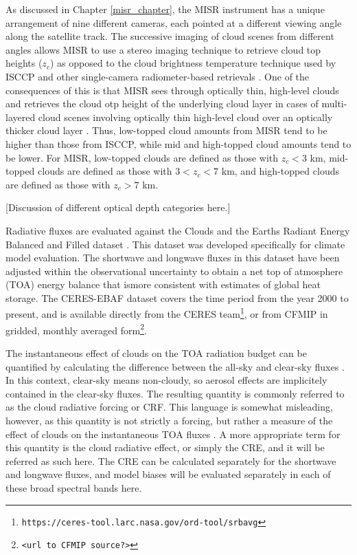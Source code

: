 As discussed in Chapter \ref{misr_chapter}, the MISR instrument has a unique arrangement of nine different cameras, each pointed at a different viewing angle along the satellite track. The successive imaging of cloud scenes from different angles allows MISR to use a stereo imaging technique to retrieve cloud top heights ($z_c$) as opposed to the cloud brightness temperature technique used by ISCCP and other single-camera radiometer-based retrievals \citep{moroney_et_al_2002, muller_et_al_2002}. One of the consequences of this is that MISR sees through optically thin, high-level clouds and retrieves the cloud otp height of the underlying cloud layer in cases of multi-layered cloud scenes involving optically thin high-level cloud over an optically thicker cloud layer \citep{marchand_et_al_2010}. Thus, low-topped cloud amounts from MISR tend to be higher than those from ISCCP, while mid and high-topped cloud amounts tend to be lower. For MISR, low-topped clouds are defined as those with $z_c < 3$ km, mid-topped clouds are defined as those with $3 < z_c < 7$ km, and high-topped clouds are defined as those with $z_c > 7$ km.

[Discussion of different optical depth categories here.]

Radiative fluxes are evaluated against the Clouds and the Earths Radiant Energy Balanced and Filled dataset \citep[CERES-EBAF Version 2.6;][]{loeb_et_al_2009}. This dataset was developed specifically for climate model evaluation. The shortwave and longwave fluxes in this dataset have been adjusted within the observational uncertainty to obtain a net top of atmosphere (TOA) energy balance that ismore consistent with estimates of global heat storage. The CERES-EBAF dataset covers the time period from the year 2000 to present, and is available directly from the CERES team\footnote{\tt https://ceres-tool.larc.nasa.gov/ord-tool/srbavg}, or from CFMIP in gridded, monthly averaged form\footnote{\tt <url to CFMIP source?>}.

The instantaneous effect of clouds on the TOA radiation budget can be quantified by calculating the difference between the all-sky and clear-sky fluxes \citep[e.g.,][]{ellis_and_vonderhaar_1976, ramanathan_1987, ramanathan_et_al_1989}. In this context, clear-sky means non-cloudy, so aerosol effects are implicitely contained in the clear-sky fluxes. The resulting quantity is commonly referred to as the cloud radiative forcing or CRF. This language is somewhat misleading, however, as this quantity is not strictly a forcing, but rather a measure of the effect of clouds on the instantaneous TOA fluxes \citep{stephens_2005}. A more appropriate term for this quantity is the cloud radiative effect, or simply the CRE, and it will be referred as such here. The CRE can be calculated separately for the shortwave and longwave fluxes, and model biases will be evaluated separately in each of these broad spectral bands here.

